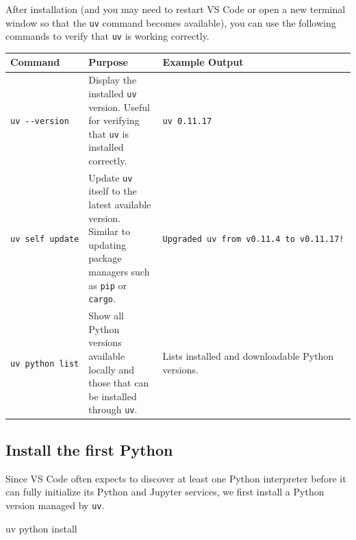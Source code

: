 \documentclass[
  letterpaper,
  DIV=11,
  numbers=noendperiod]{scrreprt}
\newenvironment{Shaded}{\begin{snugshade}}{\end{snugshade}}
\newcommand{\ExtensionTok}[1]{\textcolor[rgb]{0.00,0.23,0.31}{#1}}
\newcommand{\NormalTok}[1]{\textcolor[rgb]{0.00,0.23,0.31}{#1}}
\newcounter{none} %
\theoremstyle{definition}
\theoremstyle{definition}
\theoremstyle{plain}
\theoremstyle{plain}
\theoremstyle{remark}
\begin{document}
After installation (and you may need to restart VS Code or open a new
terminal window so that the \texttt{uv} command becomes available), you
can use the following commands to verify that \texttt{uv} is working
correctly.

{\def\LTcaptype{none} %
\begin{longtable}[]{@{}
  >{\raggedright\arraybackslash}p{}
  >{\raggedright\arraybackslash}p{}
  >{\raggedright\arraybackslash}p{}@{}}
\toprule\noalign{}
\begin{minipage}[b]{\linewidth}\raggedright
Command
\end{minipage} & \begin{minipage}[b]{\linewidth}\raggedright
Purpose
\end{minipage} & \begin{minipage}[b]{\linewidth}\raggedright
Example Output
\end{minipage} \\
\midrule\noalign{}
\endhead
\bottomrule\noalign{}
\endlastfoot
\texttt{uv\ -\/-version} & Display the installed \texttt{uv} version.
Useful for verifying that \texttt{uv} is installed correctly. &
\texttt{uv\ 0.11.17} \\
\texttt{uv\ self\ update} & Update \texttt{uv} itself to the latest
available version. Similar to updating package managers such as
\texttt{pip} or \texttt{cargo}. &
\texttt{Upgraded\ uv\ from\ v0.11.4\ to\ v0.11.17!} \\
\texttt{uv\ python\ list} & Show all Python versions available locally
and those that can be installed through \texttt{uv}. & Lists installed
and downloadable Python versions. \\
\end{longtable}
}

\subsection{Install the first Python}\label{install-the-first-python}

Since VS Code often expects to discover at least one Python interpreter
before it can fully initialize its Python and Jupyter services, we first
install a Python version managed by \texttt{uv}.

\begin{Shaded}
\begin{Highlighting}[]
\ExtensionTok{uv}\NormalTok{ python install}
\end{Highlighting}
\end{Shaded}
\end{document}
